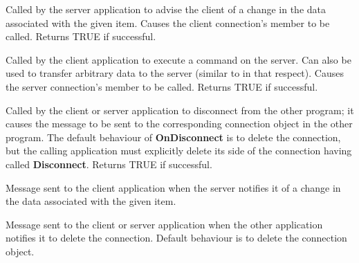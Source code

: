 

Called by the server application to advise the client of a change in
the data associated with the given item. Causes the client
connection's 
member to be called. Returns TRUE if successful.



Called by the client application to execute a command on the server. Can
also be used to transfer arbitrary data to the server (similar
to  in that respect). Causes the
server connection's  member to be
called. Returns TRUE if successful.



Called by the client or server application to disconnect from the other
program; it causes the  message
to be sent to the corresponding connection object in the other
program. The default behaviour of {\bf OnDisconnect} is to delete the
connection, but the calling application must explicitly delete its
side of the connection having called {\bf Disconnect}. Returns TRUE if
successful.

\label{wxconnectiononadvise}


Message sent to the client application when the server notifies it of a
change in the data associated with the given item.

\label{wxconnectionondisconnect}


Message sent to the client or server application when the other
application notifies it to delete the connection. Default behaviour is
to delete the connection object.

